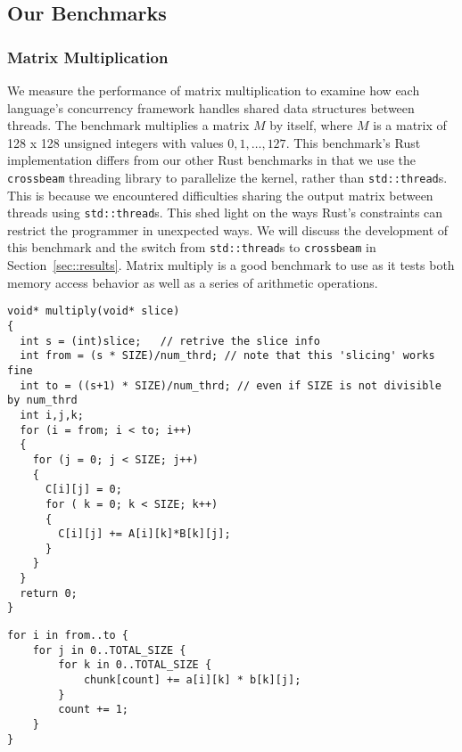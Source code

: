 \subsection{Our Benchmarks}
\subsubsection{Matrix Multiplication}
We measure the performance of matrix multiplication to examine how each language's concurrency framework handles shared data structures between threads. The benchmark multiplies a matrix $M$ by itself, where $M$ is a matrix of 128 x 128 unsigned integers with values $0, 1, \dots, 127$. This benchmark's Rust implementation differs from our other Rust benchmarks in that we use the \texttt{crossbeam} threading library to parallelize the kernel, rather than \texttt{std::thread}s. This is because we encountered difficulties sharing the output matrix between threads using \texttt{std::thread}s. This shed light on the ways Rust's constraints can restrict the programmer in unexpected ways. We will discuss the development of this benchmark and the switch from \texttt{std::thread}s to \texttt{crossbeam} in Section~\ref{sec::results}. Matrix multiply is a good benchmark to use as it tests both memory access behavior as well as a series of arithmetic operations.

\begin{lstlisting}[caption={Matrix Multiply C kernel}]
void* multiply(void* slice)
{
  int s = (int)slice;   // retrive the slice info
  int from = (s * SIZE)/num_thrd; // note that this 'slicing' works fine
  int to = ((s+1) * SIZE)/num_thrd; // even if SIZE is not divisible by num_thrd
  int i,j,k; 
  for (i = from; i < to; i++)
  {  
    for (j = 0; j < SIZE; j++)
    {
      C[i][j] = 0;
      for ( k = 0; k < SIZE; k++)
      {
      	C[i][j] += A[i][k]*B[k][j];
      }
    }
  }
  return 0;
}
\end{lstlisting}

\begin{lstlisting}[caption={Matrix Multiply Rust kernel}]
for i in from..to {
    for j in 0..TOTAL_SIZE {
        for k in 0..TOTAL_SIZE {
            chunk[count] += a[i][k] * b[k][j];
        }
        count += 1;
    }
}

\end{lstlisting}
